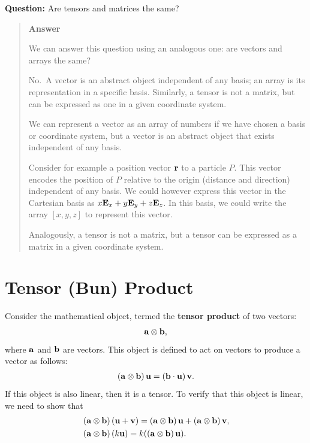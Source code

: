 \documentclass[
  letterpaper,
  DIV=11,
  numbers=noendperiod]{scrreprt}
\newcommand{\lp}{\left(}
\newcommand{\rp}{\right)}
\begin{document}
\begin{tcolorbox}[enhanced jigsaw, arc=.35mm, bottomrule=.15mm, bottomtitle=1mm, breakable, colback=white, colbacktitle=quarto-callout-tip-color!10!white, colframe=quarto-callout-tip-color-frame, coltitle=black, left=2mm, leftrule=.75mm, opacityback=0, opacitybacktitle=0.6, rightrule=.15mm, title=\textcolor{quarto-callout-tip-color}{\faLightbulb}\hspace{0.5em}{Think!}, titlerule=0mm, toprule=.15mm, toptitle=1mm]

\textbf{Question:} Are tensors and matrices the same?

\begin{quote}
\textbf{Answer}

We can answer this question using an analogous one: are vectors and
arrays the same?

No.~A vector is an abstract object independent of any basis; an array is
its representation in a specific basis. Similarly, a tensor is not a
matrix, but can be expressed as one in a given coordinate system.

We can represent a vector as an array of numbers if we have chosen a
basis or coordinate system, but a vector is an abstract object that
exists independent of any basis.

Consider for example a position vector \({\bf r}\) to a particle \(P\).
This vector encodes the position of \(P\) relative to the origin
(distance and direction) independent of any basis. We could however
express this vector in the Cartesian basis as
\(x{\bf E}_x+y{\bf E}_y+z{\bf E}_z\). In this basis, we could write the
array \([x,y,z]\) to represent this vector.

Analogously, a tensor is not a matrix, but a tensor can be expressed as
a matrix in a given coordinate system.
\end{quote}

\end{tcolorbox}

\section{Tensor (Bun) Product}\label{tensor-bun-product}

Consider the mathematical object, termed the \textbf{tensor product} of
two vectors: \begin{align}
    {\bf a}\otimes{\bf b},
\end{align} where \({\bf a}\) and \({\bf b}\) are vectors. This object
is defined to act on vectors to produce a vector as follows:
\begin{align}
    \lp {\bf a}\otimes{\bf b} \rp{\bf u} = \lp {\bf b}\cdot{\bf u}\rp{\bf v}.
\end{align} If this object is also linear, then it is a tensor. To
verify that this object is linear, we need to show that \begin{align}
    &\lp {\bf a}\otimes{\bf b}\rp({\bf u}+{\bf v}) = \lp{\bf a}\otimes{\bf b}\rp{\bf u}+\lp{\bf a}\otimes{\bf b}\rp{\bf v},\\
    &\lp {\bf a}\otimes{\bf b}\rp(k{\bf u}) = k(\lp{\bf a}\otimes{\bf b}\rp{\bf u}).
\end{align}
\end{document}
